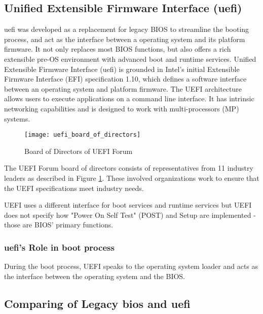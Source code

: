 \subsection{Unified Extensible Firmware Interface (\gls{uefi})}
\gls{uefi} was developed as a replacement for legacy BIOS to streamline the booting process, and act as the interface between a operating system and its platform firmware. It not only replaces most BIOS functions, but also offers a rich extensible pre-OS environment with advanced boot and runtime services.
Unified Extensible Firmware Interface (\gls{uefi}) is grounded in Intel's initial Extensible Firmware Interface (EFI) specification 1.10, which defines a software interface between an operating system and platform firmware. The UEFI architecture allows users to execute applications on a command line interface. It has intrinsic networking capabilities and is designed to work with multi-processors (MP) systems.

\begin{figure}[h]
	\texttt{[image: uefi\_board\_of\_directors]}
	\caption{Board of Directors of UEFI Forum}\label{fig:introduction-uefi-board-of-directors}
\end{figure}

The UEFI Forum board of directors consists of representatives from 11 industry leaders as described in Figure \ref{fig:introduction-uefi-board-of-directors}. These involved organizations work to ensure that the UEFI specifications meet industry needs.

UEFI uses a different interface for boot services and runtime services but UEFI does not specify how "Power On Self Test" (POST) and Setup are implemented - those are BIOS' primary functions.

\subsubsection{\gls{uefi}'s Role in boot process}

During the boot process, UEFI speaks to the operating system loader and acts as the interface between the operating system and the BIOS.


\subsection{Comparing of Legacy \gls{bios} and \gls{uefi}}



